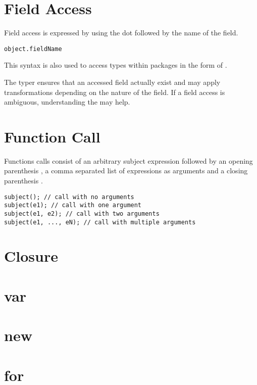 \documentclass{haxe}
\begin{document}
\section{Field Access}
\label{expression-field-access}

Field access is expressed by using the dot  followed by the name of the field.

\begin{lstlisting}
object.fieldName
\end{lstlisting}

This syntax is also used to access types within packages in the form of . 

The typer ensures that an accessed field actually exist and may apply transformations depending on the nature of the field. If a field access is ambiguous, understanding the  may help.


\section{Function Call}
\label{expression-function-call}

Functions calls consist of an arbitrary subject expression followed by an opening parenthesis \expr{(}, a comma \expr{,} separated list of expressions as arguments and a closing parenthesis \expr{)}.

\begin{lstlisting}
subject(); // call with no arguments
subject(e1); // call with one argument
subject(e1, e2); // call with two arguments
subject(e1, ..., eN); // call with multiple arguments
\end{lstlisting}




\section{Closure}
\label{expression-closure}

\section{var}
\label{expression-var}

\section{new}
\label{expression-new}

\section{for}
\label{expression-for}
\end{document}
